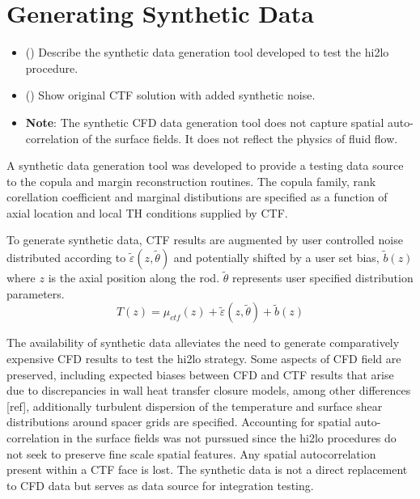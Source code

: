 
\section{Generating Synthetic Data}

\begin{itemize}
    \item (\checkmark) Describe the synthetic data generation tool developed to test the hi2lo procedure.
        \begin{itemize}
        \end{itemize}
    \item (\checkmark) Show original CTF solution with added synthetic noise.
    \item \textbf{Note}: The synthetic CFD data generation tool does not capture spatial auto-correlation of the surface fields.  It does not reflect
        the physics of fluid flow.
\end{itemize}

A synthetic data generation tool was developed to provide a testing data source to the copula and margin reconstruction routines.  The copula family, rank corellation coefficient and marginal distibutions are specified as a function of axial location and local TH conditions supplied by CTF.

To generate synthetic data, CTF results are augmented by user controlled noise distributed according to
    $\tilde \varepsilon(z, \tilde \theta)$
    and potentially shifted by a user set bias,
    $\tilde b(z)$ where $z$ is the axial position along the rod.
    $\tilde \theta$ represents user specified distribution parameters.
    \begin{equation}
        T(z) = \mu_{ctf}(z) + \tilde \varepsilon (z, \tilde \theta) + \tilde b(z)
    \end{equation}


The availability of synthetic data alleviates the need to generate comparatively expensive CFD results to test the hi2lo strategy.  Some aspects of CFD field are preserved, including expected biases between CFD and CTF results that arise due to discrepancies in wall heat transfer closure models, among other differences [ref], additionally turbulent dispersion of the temperature and surface shear distributions around spacer grids are specified.  Accounting for spatial auto-correlation in the surface fields was not purssued since the hi2lo procedures do not seek to preserve fine scale spatial features.  Any spatial autocorrelation present within a CTF face is lost.  The synthetic data is not a direct replacement to CFD data but serves as data source for integration testing.

